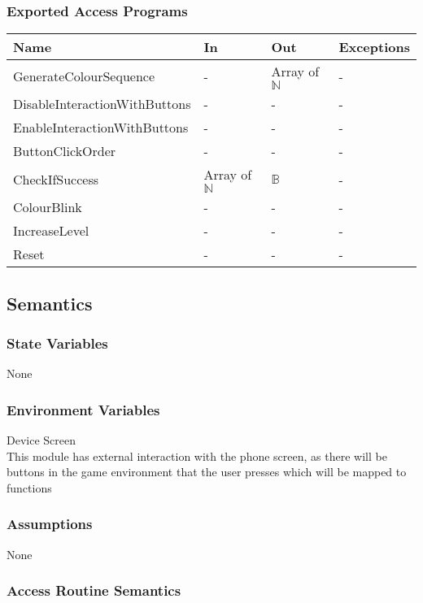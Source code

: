 \documentclass[12pt, titlepage]{article}
\begin{document}
\subsubsection{Exported Access Programs}

\begin{center}
\begin{tabular}{p{5cm} p{4cm} p{4cm} p{2cm}}
\hline
\textbf{Name} & \textbf{In} & \textbf{Out} & \textbf{Exceptions} \\
\hline
GenerateColourSequence & - & Array of $\mathds{N}$ & - \\
DisableInteractionWithButtons & - & - & - \\
EnableInteractionWithButtons & - & - & - \\
ButtonClickOrder & - & - & - \\
CheckIfSuccess & Array of $\mathds{N}$ & $\mathds{B}$ & - \\
ColourBlink & - & - & - \\
IncreaseLevel & - & - & - \\
Reset & - & - & - \\
\hline
\end{tabular}
\end{center}

\subsection{Semantics}

\subsubsection{State Variables}

None

\subsubsection{Environment Variables}

Device Screen\\
This module has external interaction with the phone screen, as there will be buttons in the game environment that the user presses which will be mapped to functions


\subsubsection{Assumptions}

None

\subsubsection{Access Routine Semantics}
\end{document}
